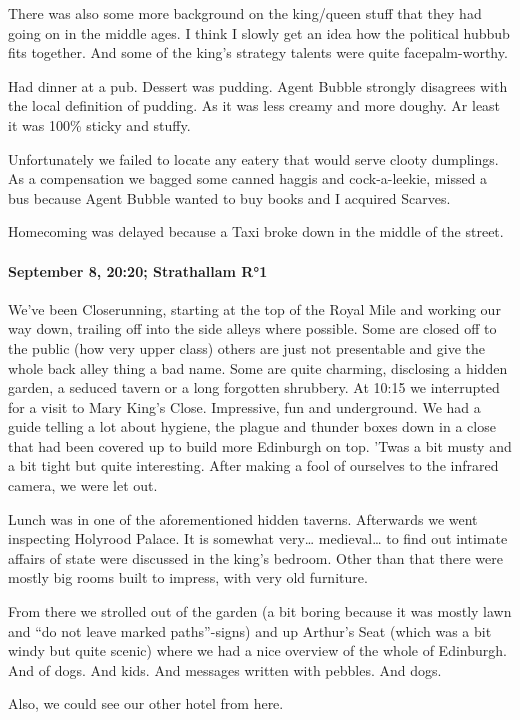 There was also some more background on the king/queen stuff that they had going on in the middle ages.
I think I slowly get an idea how the political hubbub fits together.
And some of the king's strategy talents were quite facepalm-worthy.

Had dinner at a pub.
Dessert was pudding.
Agent Bubble strongly disagrees with the local definition of pudding.
As it was less creamy and more doughy.
Ar least it was 100\% sticky and stuffy.

Unfortunately we failed to locate any eatery that would serve clooty dumplings.
As a compensation we bagged some canned haggis and cock-a-leekie, missed a bus because Agent Bubble wanted to buy books and I acquired Scarves.

Homecoming was delayed because a Taxi broke down in the middle of the street.

\paragraph{September 8, 20:20; Strathallam R°1}
We've been Closerunning, starting at the top of the Royal Mile and working our way down, trailing off into the side alleys where possible.
Some are closed off to the public (how very upper class) others are just not presentable and give the whole back alley thing a bad name.
Some are quite charming, disclosing a hidden garden, a seduced tavern or a long forgotten shrubbery.
At 10:15 we interrupted for a visit to Mary King's Close.
Impressive, fun and underground.
We had a guide telling a lot about hygiene, the plague and thunder boxes down in a close that had been covered up to build more Edinburgh on top.
'Twas a bit musty and a bit tight but quite interesting.
After making a fool of ourselves to the infrared camera, we were let out.

Lunch was in one of the aforementioned hidden taverns.
Afterwards we went inspecting Holyrood Palace.
It is somewhat very\ldots{} medieval\ldots{} to find out intimate affairs of state were discussed in the king's bedroom.
Other than that there were mostly big rooms built to impress, with very old furniture.

From there we strolled out of the garden (a bit boring because it was mostly lawn and "`do not leave marked paths"'-signs) and up Arthur's Seat (which was a bit windy but quite scenic) where we had a nice overview of the whole of Edinburgh.
And of dogs.
And kids.
And messages written with pebbles.
And dogs.

Also, we could see our other hotel from here.

